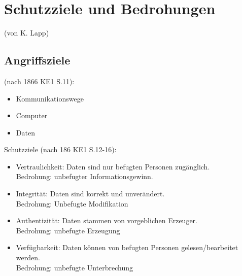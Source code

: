 \section*{Schutzziele und Bedrohungen}
(von K. Lapp)

\subsection{Angriffsziele} (nach 1866 KE1 S.11):

\begin{itemize}
  \item Kommunikationswege
  \item Computer
  \item Daten
\end{itemize}
Schutzziele (nach 186 KE1 S.12-16):

\begin{itemize}
  \item Vertraulichkeit: Daten sind nur befugten Personen zugänglich. \\
  Bedrohung: unbefugter Informationsgewinn.
  \item Integrität: Daten sind korrekt und unverändert. \\ Bedrohung: Unbefugte Modifikation
  \item Authentizität: Daten stammen von vorgeblichen Erzeuger. \\
  Bedrohung: unbefugte Erzeugung
  \item Verfügbarkeit: Daten können von befugten Personen gelesen/bearbeitet werden. \\
  	Bedrohung: unbefugte Unterbrechung
\end{itemize}

